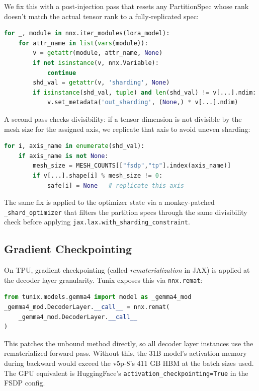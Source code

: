 \documentclass[11pt,a4paper]{article}
\begin{document}
We fix this with a post-injection pass that resets any PartitionSpec whose rank doesn't match the actual tensor rank to a fully-replicated spec:

\begin{lstlisting}[language=python]
for _, module in nnx.iter_modules(lora_model):
    for attr_name in list(vars(module)):
        v = getattr(module, attr_name, None)
        if not isinstance(v, nnx.Variable):
            continue
        shd_val = getattr(v, 'sharding', None)
        if isinstance(shd_val, tuple) and len(shd_val) != v[...].ndim:
            v.set_metadata('out_sharding', (None,) * v[...].ndim)
\end{lstlisting}

A second pass checks divisibility: if a tensor dimension is not divisible by the mesh size for the assigned axis, we replicate that axis to avoid uneven sharding:

\begin{lstlisting}[language=python]
for i, axis_name in enumerate(shd_val):
    if axis_name is not None:
        mesh_size = MESH_COUNTS[["fsdp","tp"].index(axis_name)]
        if v[...].shape[i] % mesh_size != 0:
            safe[i] = None   # replicate this axis
\end{lstlisting}

The same fix is applied to the optimizer state via a monkey-patched \texttt{\_shard\_optimizer} that filters the partition specs through the same divisibility check before applying \texttt{jax.lax.with\_sharding\_constraint}.

\subsection{Gradient Checkpointing}

On TPU, gradient checkpointing (called \emph{rematerialization} in JAX) is applied at the decoder layer granularity. Tunix exposes this via \texttt{nnx.remat}:

\begin{lstlisting}[language=python]
from tunix.models.gemma4 import model as _gemma4_mod
_gemma4_mod.DecoderLayer.__call__ = nnx.remat(
    _gemma4_mod.DecoderLayer.__call__
)
\end{lstlisting}

This patches the unbound method directly, so all decoder layer instances use the rematerialized forward pass. Without this, the 31B model's activation memory during backward would exceed the v5p-8's 411 GB HBM at the batch sizes used. The GPU equivalent is HuggingFace's \texttt{activation\_checkpointing=True} in the FSDP config.
\end{document}
